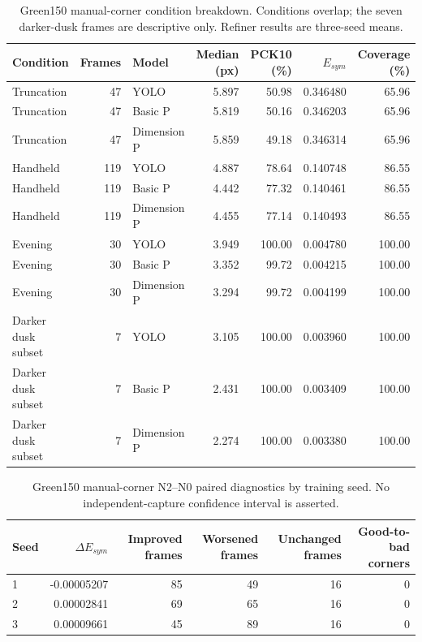 \begin{table}[t]\centering
\caption{Green150 manual-corner condition breakdown. Conditions overlap; the seven darker-dusk frames are descriptive only. Refiner results are three-seed means.}
\begin{tabular}{lrlrrrr}\toprule
Condition & Frames & Model & Median (px) & PCK10 (\%) & $E_{sym}$ & Coverage (\%) \\ \midrule
Truncation & 47 & YOLO & 5.897 & 50.98 & 0.346480 & 65.96 \\
Truncation & 47 & Basic P & 5.819 & 50.16 & 0.346203 & 65.96 \\
Truncation & 47 & Dimension P & 5.859 & 49.18 & 0.346314 & 65.96 \\
Handheld & 119 & YOLO & 4.887 & 78.64 & 0.140748 & 86.55 \\
Handheld & 119 & Basic P & 4.442 & 77.32 & 0.140461 & 86.55 \\
Handheld & 119 & Dimension P & 4.455 & 77.14 & 0.140493 & 86.55 \\
Evening & 30 & YOLO & 3.949 & 100.00 & 0.004780 & 100.00 \\
Evening & 30 & Basic P & 3.352 & 99.72 & 0.004215 & 100.00 \\
Evening & 30 & Dimension P & 3.294 & 99.72 & 0.004199 & 100.00 \\
Darker dusk subset & 7 & YOLO & 3.105 & 100.00 & 0.003960 & 100.00 \\
Darker dusk subset & 7 & Basic P & 2.431 & 100.00 & 0.003409 & 100.00 \\
Darker dusk subset & 7 & Dimension P & 2.274 & 100.00 & 0.003380 & 100.00 \\
\bottomrule\end{tabular}
\label{tab:green-conditions}
\end{table}
\begin{table}[t]\centering
\caption{Green150 manual-corner N2--N0 paired diagnostics by training seed. No independent-capture confidence interval is asserted.}
\begin{tabular}{lrrrrr}\toprule
Seed & $\Delta E_{sym}$ & Improved frames & Worsened frames & Unchanged frames & Good-to-bad corners \\ \midrule
1 & -0.00005207 & 85 & 49 & 16 & 0 \\
2 & 0.00002841 & 69 & 65 & 16 & 0 \\
3 & 0.00009661 & 45 & 89 & 16 & 0 \\
\bottomrule\end{tabular}
\label{tab:green-seeds}
\end{table}
